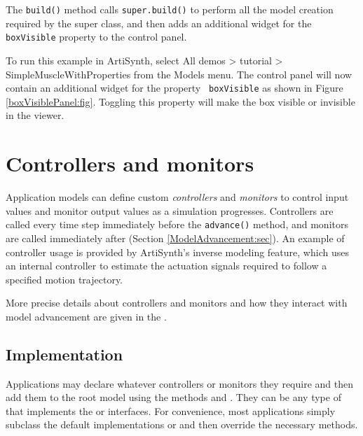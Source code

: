The {\tt build()} method calls {\tt super.build()} to perform all the
model creation required by the super class, and then adds an
additional widget for the {\tt boxVisible} property to the control
panel.

To run this example in ArtiSynth, select {\sf All demos > tutorial >
SimpleMuscleWithProperties} from the {\sf Models} menu. The control
panel will now contain an additional widget for the property {\tt
boxVisible} as shown in Figure \ref{boxVisiblePanel:fig}. Toggling
this property will make the box visible or invisible in the viewer.


\section{Controllers and monitors}
\label{ControllersAndMonitors:sec}

Application models can define custom {\it controllers} and {\it
monitors} to control input values and monitor output values as a
simulation progresses. Controllers are called every time step
immediately before the {\tt advance()} method, and monitors are called
immediately after (Section \ref{ModelAdvancement:sec}).  An example of
controller usage is provided by ArtiSynth's inverse modeling feature,
which uses an internal controller to estimate the actuation signals
required to follow a specified motion trajectory.

More precise details about controllers and monitors and how they
interact with model advancement are given in the
.

\subsection{Implementation}
\label{ControllerImplementation:sec}

Applications may declare whatever controllers or monitors they require
and then add them to the root model using the methods
 and
.
They can be any type of
 that implements
the  or
 interfaces.  For
convenience, most applications simply subclass
the default implementations
 or
 and then override
the necessary methods.

